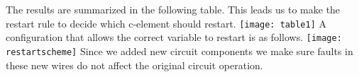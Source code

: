 \documentclass{article}
\begin{document}
\newline
The results are summarized in the following table.  
This leads us to make the restart rule to decide which c-element should restart.  \newline
\texttt{[image: table1]}
A configuration that allows the correct variable to restart is as follows. \newline
\texttt{[image: restartscheme]}
Since we added new circuit components we make sure faults in these new wires do not affect the original circuit operation.  

\end{document}
